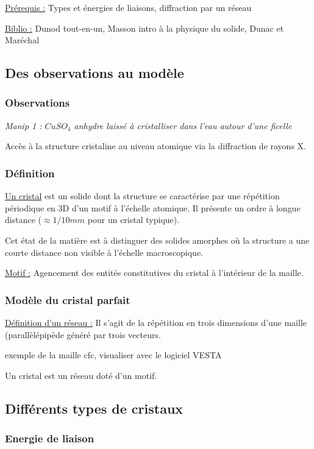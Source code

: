 \documentclass{article}%
\begin{document}
\underline{Prérequis :} Types et énergies de liaisons, diffraction par un réseau

\underline{Biblio :} Dunod tout-en-un, Masson intro à la physique du solide, Dunac et Maréchal

\subsection{Des observations au modèle}

\subsubsection{Observations}

\textit{Manip 1 : $CuSO_4$ anhydre laissé à cristalliser dans l'eau autour d'une ficelle}

Accès à la structure cristaline au niveau atomique via la diffraction de rayons X.

\subsubsection{Définition}

\underline{Un cristal} est un solide dont la structure se caractérise par une répétition périodique en 3D d'un motif à l'échelle atomique. Il présente un ordre à longue distance ($\approx 1/10 mm$ pour un cristal typique).

Cet état de la matière est à distinguer des solides amorphes où la structure a une courte distance non visible à l'échelle macroscopique.

\underline{Motif :} Agencement des entités constitutives du cristal à l'intérieur de la maille.
\subsubsection{Modèle du cristal parfait}

\underline{Définition d'un réseau :} Il s'agit de la répétition en trois dimensions d'une maille (parallèlépipède généré par trois vecteurs.

	exemple de la maille cfc, visualiser avec le logiciel VESTA

Un cristal est un réseau doté d'un motif.

\subsection{Différents types de cristaux}
\subsubsection{Energie de liaison}
\end{document}
